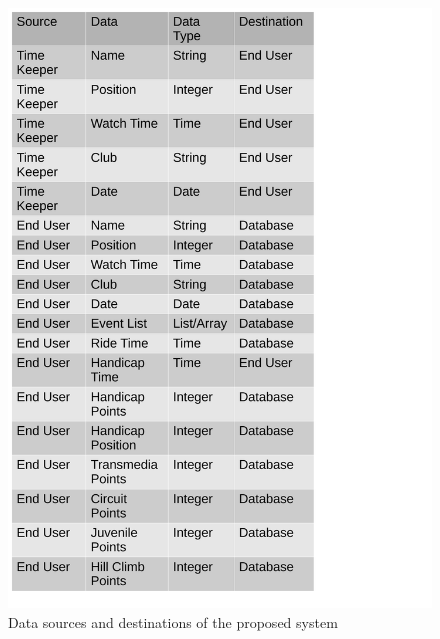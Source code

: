 \begin{figure}[H]
	\includegraphics[width=\textwidth]{./DataSourcesPS.pdf}
	 \caption{Data sources and destinations of the proposed system}
\end{figure}

